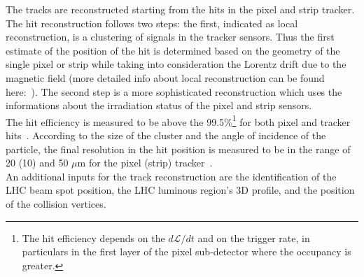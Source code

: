 The tracks are reconstructed starting from the hits in the pixel and
strip tracker. The hit reconstruction follows two steps: the first,
indicated as local reconstruction, is a clustering of signals in the
tracker sensors. Thus 
the first estimate of the
position of the hit is determined based on the geometry of the single
pixel or strip while taking into consideration the Lorentz drift due
to the magnetic field (more detailed info about local reconstruction
can be found here:~\cite{CMS:particleflow}). The second step is a more
sophisticated reconstruction which uses the informations about the
irradiation status of the pixel and strip sensors. \\
The hit efficiency is measured to be above the 99.5\%\footnote{The hit
  efficiency depends on the
$d\mathcal{L}/dt$ and on the trigger rate, in particulars in
the first layer of the pixel sub-detector where the occupancy is greater.} for both pixel
and tracker hits~\cite{CMS:particleflow}. According to the size of the
cluster and the angle of
incidence of the particle, the final resolution in the
hit position is measured to be in the range of 20 (10) and 50 $\mu$m
for the pixel (strip) tracker~\cite{CMS:particleflow}.\\
An additional inputs for the track reconstruction are the identification
of the LHC beam spot position, \ie the LHC luminous region's
3D profile, and the position of the collision
vertices. 

